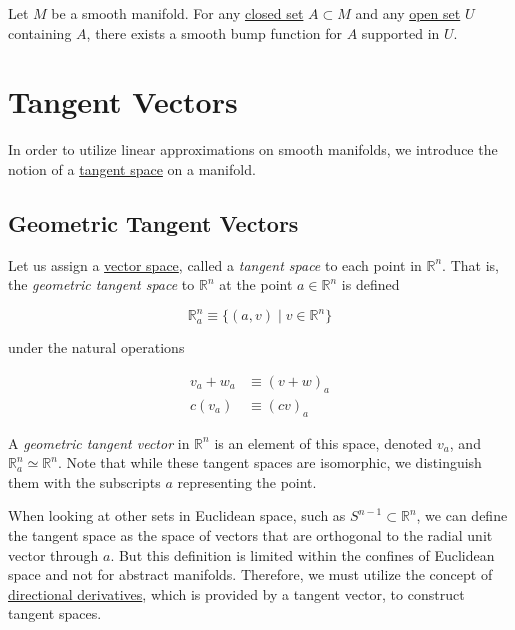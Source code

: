 \documentclass{article}
\newcounter{theorem}[section]
\newcounter{definition}[section]
\begin{document}
      \begin{theorem}
        \label{thm:existence-of-bump-functions}
        Let $M$ be a smooth manifold. For any \hyperref[pst-def:closed]{closed set} $A \subset M$ and any \hyperref[pst-def:open-set]{open set} $U$ containing $A$, there exists a smooth bump function for $A$ supported in $U$. 
      \end{theorem}

\section{Tangent Vectors}

  In order to utilize linear approximations on smooth manifolds, we introduce the notion of a \hyperref[mv-def:tangent-space]{tangent space} on a manifold. 

  \subsection{Geometric Tangent Vectors}

    Let us assign a \hyperref[lin-def:vector-space]{vector space}, called a \textit{tangent space} to each point in $\mathbb{R}^n$. That is, the \textit{geometric tangent space} to $\mathbb{R}^n$ at the point $a \in \mathbb{R}^n$ is defined

      \begin{equation}
        \mathbb{R}_a^n \equiv \{(a, v) \;|\; v \in \mathbb{R}^n \}
      \end{equation}

    under the natural operations

    \begin{align*}
      v_a + w_a & \equiv (v + w)_a \\
      c (v_a) & \equiv (c v)_a
    \end{align*}

    A \textit{geometric tangent vector} in $\mathbb{R}^n$ is an element of this space, denoted $v_a$, and $\mathbb{R}^n_a \simeq \mathbb{R}^n$. Note that while these tangent spaces are isomorphic, we distinguish them with the subscripts $a$ representing the point. 

    When looking at other sets in Euclidean space, such as $S^{n-1} \subset \mathbb{R}^n$, we can define the tangent space as the space of vectors that are orthogonal to the radial unit vector through $a$. But this definition is limited within the confines of Euclidean space and not for abstract manifolds. Therefore, we must utilize the concept of \hyperref[mv-def:directional-derivative]{directional derivatives}, which is provided by a tangent vector, to construct tangent spaces. 
\end{document}

